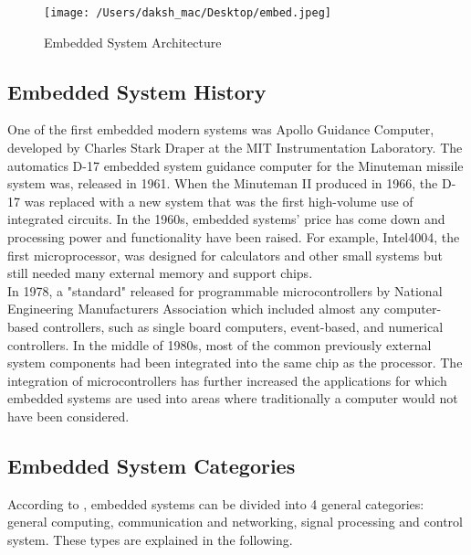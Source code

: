 \documentclass[12pt]{article}
\begin{document}
\begin{figure}[H]
	\centering
	\texttt{[image: /Users/daksh\_mac/Desktop/embed.jpeg]}
	\caption[About embedded system]{Embedded System Architecture}
	\label{fig:embedarch}	
\end{figure}

\subsection{Embedded System History}
One of the first embedded modern systems was Apollo Guidance Computer, developed by Charles Stark Draper at the MIT Instrumentation
Laboratory. The automatics D-17 embedded system guidance computer for the Minuteman missile system was, released in 1961. When the
Minuteman II produced in 1966, the D-17 was replaced with a new system that was the first high-volume use of integrated circuits. In the 1960s,
embedded systems’ price has come down and processing power and functionality have been raised. For example, Intel4004, the first
microprocessor, was designed for calculators and other small systems but still needed many external memory and support chips.\\
In 1978, a "standard" released for programmable microcontrollers by National Engineering Manufacturers Association which included almost
any computer-based controllers, such as single board computers, event-based, and numerical controllers. In the middle of 1980s, most of the
common previously external system components had been integrated into the same chip as the processor. The integration of microcontrollers has
further increased the applications for which embedded systems are used into areas where traditionally a computer would not have been
considered.
\subsection{Embedded System Categories}
According to \cite{ref:embedcat}, embedded systems can be divided into 4 general categories: general computing, communication and networking, signal
processing and control system. These types are explained in the following.
\end{document}
